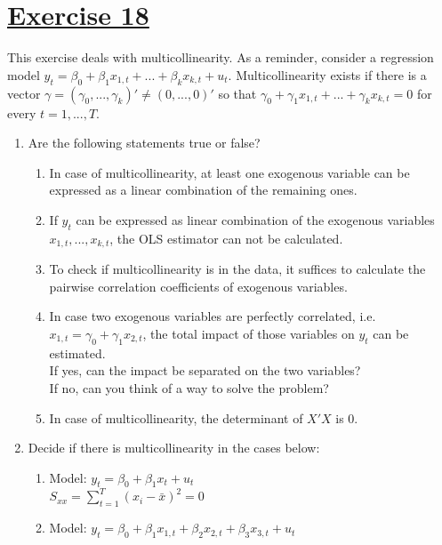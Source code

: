 \documentclass[captions=tableheading, 12pt, headings=small, parskip=half]{scrartcl}
\begin{document}
\section*{\underline{Exercise 18}}
This exercise deals with multicollinearity. As a reminder, consider a regression model $y_t = \beta_0 + \beta_1 x_{1, t} + ... + \beta_k x_{k, t} + u_t$. Multicollinearity exists if there is a vector $\gamma = (\gamma_0, ..., \gamma_k)'\ne (0,...,0)'$ so that $\gamma_0 + \gamma_1 x_{1,t} + ... + \gamma_k x_{k, t} = 0$ for every $t = 1,...,T$. \\
\begin{enumerate}[label = \alph*)]
	\item Are the following statements true or false?
	\begin{enumerate}[label = (\roman*)]
		\item In case of multicollinearity, at least one exogenous variable can be expressed as a linear combination of the remaining ones.
		\item If $y_t$ can be expressed as linear combination of the exogenous variables $x_{1,t},...,x_{k,t}$, the OLS estimator can not be calculated.
		\item To check if multicollinearity is in the data, it suffices to calculate the pairwise correlation coefficients of exogenous variables.
		\item In case two exogenous variables are perfectly correlated, i.e. $x_{1,t} = \gamma_0 + \gamma_1 x_{2,t}$, the total impact of those variables on $y_t$ can be estimated.\\
		If yes, can the impact be separated on the two variables?\\
		If no, can you think of a way to solve the problem?
		\item In case of multicollinearity, the determinant of $X'X$ is 0.
	\end{enumerate}
\item Decide if there is multicollinearity in the cases below:
\begin{enumerate}[label = (\roman*)]
	\item Model: $y_t = \beta_0 + \beta_1x_t + u_t$\\
	$S_{xx} = \sum_{t = 1}^T{(x_i - \bar{x})^2} = 0$
	\item Model: $y_t = \beta_0 + \beta_1 x_{1,t} + \beta_2 x_{2,t} + \beta_3 x_{3,t} + u_t$
	\begin{figure}[h!]
	\begin{minipage}{0.49\columnwidth}
	\begin{table}[H]

\end{table}
\end{minipage}
\end{figure}
\end{enumerate}
\end{enumerate}
\end{document}
